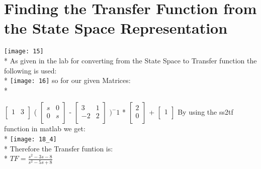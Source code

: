 \documentclass{article}
\begin{document}
\section{Finding the Transfer Function from the State Space Representation }
\texttt{[image: 15]}\\*
As given in the lab for converting from the State Space to Transfer function the following is used:\\*
\texttt{[image: 16]}
so for our given Matrices:\\*

$
\begin{bmatrix}
1 & 3\\
\end{bmatrix}
$
(
$
\begin{bmatrix}
s & 0\\
0 & s\\
\end{bmatrix}
$
-
$
\begin{bmatrix}
3 & 1\\
-2 & 2\\
\end{bmatrix}
$
$)^-1$
*
$
\begin{bmatrix}
2\\
0\\
\end{bmatrix}
$
+
$
\begin{bmatrix}
1\\
\end{bmatrix}
$
By using the ss2tf function in matlab we get:\\*
\texttt{[image: 18\_4]}\\*
Therefore the Transfer funtion is:\\*
$
TF = {\displaystyle\frac{s^2-3s-8}{s^2-5s+8}}
$
\end{document}
